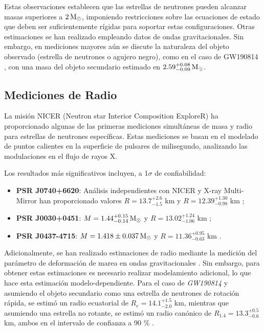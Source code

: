 Estas observaciones establecen que las estrellas de neutrones pueden alcanzar masas superiores a $2 \,\text{M}_\odot$, imponiendo restricciones sobre las ecuaciones de estado que deben ser suficientemente rígidas para soportar estas configuraciones. Otras estimaciones se han realizado empleando datos de ondas gravitacionales. Sin embargo, en mediciones mayores aún se discute la naturaleza del objeto observado (estrella de neutrones o agujero negro), como en el caso de GW190814 \cite{theligoscientificcollaborationGW190814GravitationalWaves2020, lopesNatureMassgapObject2022}, con una masa del objeto secundario estimado en $2.59^{+0.08}_{-0.09} \,\text{M}_\odot$.

\subsection{Mediciones de Radio}

La misión NICER (Neutron star Interior Composition ExploreR) ha proporcionado algunas de las primeras mediciones simultáneas de masa y radio para estrellas de neutrones específicas. Estas mediciones se basan en el modelado de puntos calientes en la superficie de pulsares de milisegundo, analizando las modulaciones en el flujo de rayos X.

Los resultados más significativos incluyen, a 1$\sigma$ de confiabilidad:

\begin{itemize}
	\item \textbf{PSR J0740+6620}: Análisis independientes con NICER y X-ray Multi-Mirror han proporcionado valores $R = 13.7^{+2.6}_{-1.5}$ km \cite{millerRadiusPSRJ0740+66202021} y $R = 12.39^{+1.30}_{-0.98}$ km \cite{rileyNICERViewMassive2021};
	
	\item \textbf{PSR J0030+0451}: $M = 1.44^{+0.15}_{-0.14} \,\text{M}_\odot$ y $R = 13.02^{+1.24}_{-1.06}$ km \cite{millerPSRJ0030+0451Mass2019};
	
	\item \textbf{PSR J0437-4715}: $M = 1.418 \pm 0.037 \,\text{M}_\odot$ y $R = 11.36^{+0.95}_{-0.63}$ km \cite{choudhuryNICERViewNearest2024}.
\end{itemize}

Adicionalmente, se han realizado estimaciones de radio mediante la medición del parámetro de deformación de marea en ondas gravitacionales \cite{kumarTheoreticalExperimentalConstraints2024}. Sin embargo, para obtener estas estimaciones es necesario realizar modelamiento adicional, lo que hace esta estimación modelo-dependiente. Para el caso de \textit{GW190814} y asumiendo el objeto secundario como una estrella de neutrones de rotación rápida, se estimó un radio ecuatorial de $R_e = 14.1^{+1.5}_{-2.0}$ km, mientras que asumiendo una estrella no rotante, se estimó un radio canónico de $R_{1.4} = 13.3^{+0.5}_{-0.6}$ km, ambos en el intervalo de confianza a 90 \% \cite{biswasGW190814PropertiesSecondary2021}.\\


